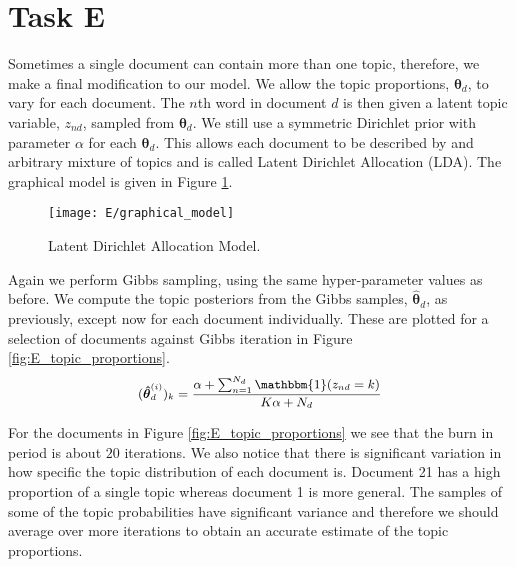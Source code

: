 \documentclass[11pt]{article}
\begin{document}
\section{Task E}
Sometimes a single document can contain more than one topic, therefore, we make a final modification to our model. We allow the topic proportions, $\boldsymbol{\theta}_d$, to vary for each document. The $n$th word in document $d$ is then given a latent topic variable, $z_{nd}$, sampled from $\boldsymbol{\theta}_d$. We still use a symmetric Dirichlet prior with parameter $\alpha$ for each $\boldsymbol{\theta}_d$. This allows each document to be described by and arbitrary mixture of topics and is called Latent Dirichlet Allocation (LDA). The graphical model is given in Figure \ref{fig:E_graphical_model}.

\begin{figure}
    \centering
    \texttt{[image: E/graphical\_model]}
    \caption{Latent Dirichlet Allocation Model.}
    \label{fig:E_graphical_model}
\end{figure}

Again we perform Gibbs sampling, using the same hyper-parameter values as before. We compute the topic posteriors from the Gibbs samples, $\boldsymbol{\hat \theta}_d$, as previously, except now for each document individually. These are plotted for a selection of documents against Gibbs iteration in Figure \ref{fig:E_topic_proportions}.
\begin{equation}
    \small
    \begin{aligned}
        (\boldsymbol{\hat \theta}_d^{(i)})_k = \frac{\alpha + \sum_{n=1}^{N_d} \mathbbm{1}(z_{nd} = k)}{K \alpha + N_d}
    \end{aligned}
\end{equation}

For the documents in Figure \ref{fig:E_topic_proportions} we see that the burn in period is about $20$ iterations. We also notice that there is significant variation in how specific the topic distribution of each document is. Document 21 has a high proportion of a single topic whereas document 1 is more general. The samples of some of the topic probabilities have significant variance and therefore we should average over more iterations to obtain an accurate estimate of the topic proportions.
\end{document}
